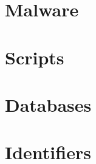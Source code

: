 \documentclass{article}
\newcommand\importsection[2]{
 \section{#1}
 
 \newpage
}
\begin{document}




\importsection{Malware}{malware.tex}
\importsection{Scripts}{scripts.tex}
\importsection{Databases}{databases.tex}
\importsection{Identifiers}{identifiers.tex}
\end{document}
